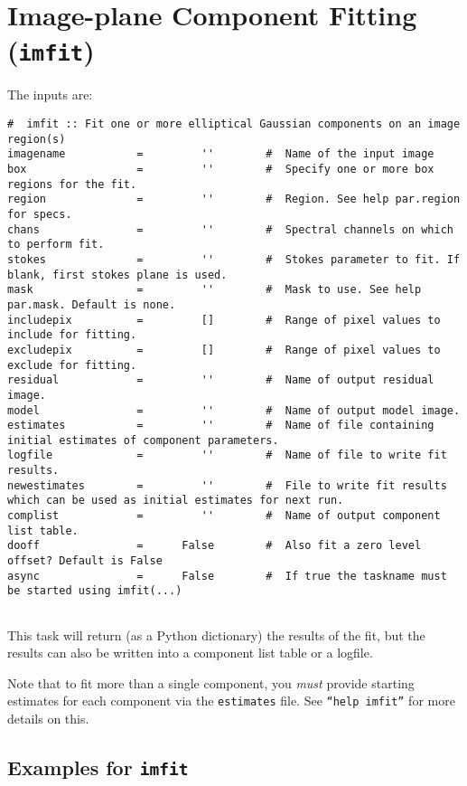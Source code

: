 \section{Image-plane Component Fitting ({\tt imfit})}
\label{section:analysis.imfit}

The inputs are:
\small
\begin{verbatim}
#  imfit :: Fit one or more elliptical Gaussian components on an image region(s)
imagename           =         ''        #  Name of the input image
box                 =         ''        #  Specify one or more box regions for the fit.
region              =         ''        #  Region. See help par.region for specs.
chans               =         ''        #  Spectral channels on which to perform fit.
stokes              =         ''        #  Stokes parameter to fit. If blank, first stokes plane is used.
mask                =         ''        #  Mask to use. See help par.mask. Default is none.
includepix          =         []        #  Range of pixel values to include for fitting.
excludepix          =         []        #  Range of pixel values to exclude for fitting.
residual            =         ''        #  Name of output residual image.
model               =         ''        #  Name of output model image.
estimates           =         ''        #  Name of file containing initial estimates of component parameters.
logfile             =         ''        #  Name of file to write fit results.
newestimates        =         ''        #  File to write fit results which can be used as initial estimates for next run.
complist            =         ''        #  Name of output component list table.
dooff               =      False        #  Also fit a zero level offset? Default is False
async               =      False        #  If true the taskname must be started using imfit(...)


\end{verbatim}
\normalsize
This task will return (as a Python dictionary) the results of the fit,
but the results can also be written into a component list table or a
logfile. 
 
Note that to fit more than a single component, you {\em must} provide
starting estimates for each component via the {\tt estimates} file.
See {\tt ``help imfit''} for more details on this.

\subsection{Examples for {\tt imfit}}
\label{section:analysis.imfit.examples}

